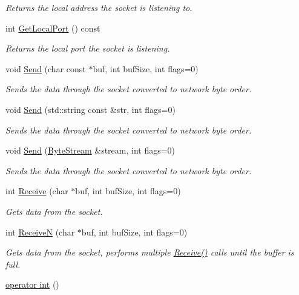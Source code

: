 \begin{DoxyCompactItemize}
\begin{DoxyCompactList}\small\item\em Returns the local address the socket is listening to. \end{DoxyCompactList}\item 
\hypertarget{class_common_1_1_socket_a87c506335670c0a6d77e422d8e50d320}{int \hyperlink{class_common_1_1_socket_a87c506335670c0a6d77e422d8e50d320}{Get\-Local\-Port} () const }\label{class_common_1_1_socket_a87c506335670c0a6d77e422d8e50d320}

\begin{DoxyCompactList}\small\item\em Returns the local port the socket is listening. \end{DoxyCompactList}\item 
void \hyperlink{class_common_1_1_socket_a325267bc6d7e1904079126b02d943094}{Send} (char const $\ast$buf, int buf\-Size, int flags=0)
\begin{DoxyCompactList}\small\item\em Sends the data through the socket converted to network byte order. \end{DoxyCompactList}\item 
void \hyperlink{class_common_1_1_socket_a425d4848f0386449831ad4faaaf0676b}{Send} (std\-::string const \&str, int flags=0)
\begin{DoxyCompactList}\small\item\em Sends the data through the socket converted to network byte order. \end{DoxyCompactList}\item 
void \hyperlink{class_common_1_1_socket_a075a8eb14c6ce67a6a484e3ea195e643}{Send} (\hyperlink{class_common_1_1_byte_stream}{Byte\-Stream} \&stream, int flags=0)
\begin{DoxyCompactList}\small\item\em Sends the data through the socket converted to network byte order. \end{DoxyCompactList}\item 
int \hyperlink{class_common_1_1_socket_ae40280a770587ef90828701db980579c}{Receive} (char $\ast$buf, int buf\-Size, int flags=0)
\begin{DoxyCompactList}\small\item\em Gets data from the socket. \end{DoxyCompactList}\item 
int \hyperlink{class_common_1_1_socket_a58b494f250b4a0b8bae190b51d70f87d}{Receive\-N} (char $\ast$buf, int buf\-Size, int flags=0)
\begin{DoxyCompactList}\small\item\em Gets data from the socket, performs multiple \hyperlink{class_common_1_1_socket_ae40280a770587ef90828701db980579c}{Receive()} calls until the buffer is full. \end{DoxyCompactList}\item 
\hypertarget{class_common_1_1_socket_a3795dee02e78387883de370ec2b04ca0}{\hyperlink{class_common_1_1_socket_a3795dee02e78387883de370ec2b04ca0}{operator int} ()}\label{class_common_1_1_socket_a3795dee02e78387883de370ec2b04ca0}


\end{DoxyCompactItemize}
